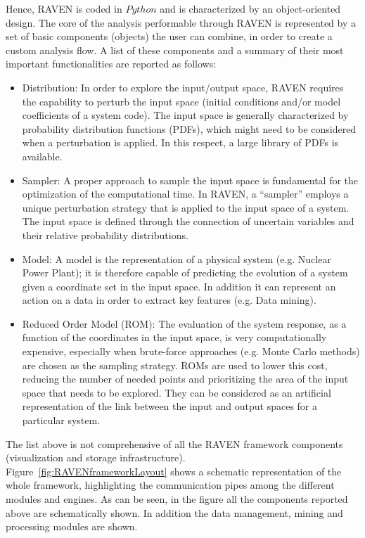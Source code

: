 Hence, RAVEN is coded in $Python$ and is characterized by an object-oriented design. The core of the analysis performable through RAVEN is represented by a set of basic components (objects) the user can combine, in order to create a custom analysis flow. A list of these components and a summary of their most important functionalities are reported as follows:
\begin{itemize}
\item	Distribution: In order to explore the input/output space, RAVEN requires the capability to perturb the input space (initial conditions and/or model coefficients of a system code). The input space is generally characterized by probability distribution functions (PDFs), which might need to be considered when a perturbation is applied. In this respect, a large library of PDFs is available.
\item Sampler: A proper approach to sample the input space is fundamental for the optimization of the computational time. In RAVEN, a ``sampler'' employs a unique perturbation strategy that is applied to the input space of a system. The input space is defined through the connection of uncertain variables and their relative probability distributions. 
\item Model: A model is the representation of a physical system (e.g. Nuclear Power Plant); it is therefore capable of predicting the evolution of a system given a coordinate set in the input space. In addition it can represent an
action on a data in order to extract key features (e.g. Data mining).
\item Reduced Order Model (ROM): The evaluation of the system response, as a function of the coordinates in the input space, is very computationally expensive, especially when brute-force approaches (e.g. Monte Carlo methods) are chosen as the sampling strategy. ROMs are used to lower this cost, reducing the number of needed points and prioritizing the area of the input space that needs to be explored. They can be considered as an artificial representation of the link between the input and output spaces for a particular system. 
\end{itemize}
The list above is not comprehensive of all the RAVEN framework components (visualization and storage infrastructure).
\\ Figure~\ref{fig:RAVENframeworkLayout} shows a schematic representation of the whole framework, highlighting the communication pipes among the different modules and engines. As can be seen, in the figure all the components reported above are schematically shown. In addition the data management, mining and processing modules are shown.

